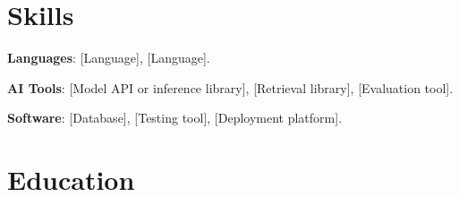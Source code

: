 \documentclass{resume}
\begin{document}
\section{Skills}
\begin{skillitems}
  \item \textbf{Languages}: [Language], [Language].
  \item \textbf{AI Tools}: [Model API or inference library], [Retrieval library], [Evaluation tool].
  \item \textbf{Software}: [Database], [Testing tool], [Deployment platform].
\end{skillitems}

\section{Education}
\end{document}
